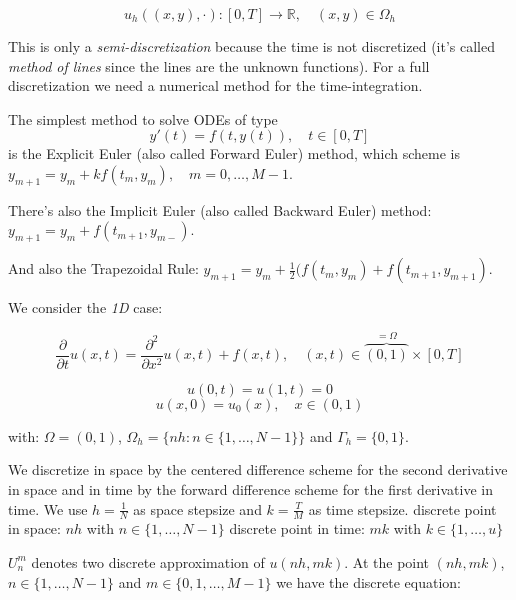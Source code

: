 \begin{equation*}
u_h ((x, y), \cdot): [0, T] \rightarrow \mathbb{R}, \quad (x, y) \in \Omega_h
\end{equation*}

This is only a \textit{semi-discretization} because the time is not discretized (it's called \textit{method of lines} since the lines are the unknown functions).
For a full discretization we need a numerical method for the time-integration.

The simplest method to solve ODEs of type
\begin{equation*}
y'(t) = f(t, y(t)), \quad t \in [0, T]
\end{equation*}
is the Explicit Euler (also called Forward Euler) method, which scheme is $y_{m+1} = y_m + k f(t_m, y_m), \quad m=0, \dots, M-1$.

There's also the Implicit Euler (also called Backward Euler) method: $y_{m+1} = y_m + f(t_{m+1}, y_{m-})$.

And also the Trapezoidal Rule: $y_{m+1} = y_m + \frac{1}{2} (f(t_m, y_m) + f(t_{m+1}, y_{m+1})$.

We consider the \textit{1D} case:

\begin{equation*}
\frac{\partial}{\partial t} u(x, t) = \frac{\partial^2}{\partial x^2} u(x, t) + f(x, t), \quad (x, t) \in \overbrace{(0, 1)}^{= \Omega} \times [0, T]
\end{equation*}

\begin{equation*}
u(0, t) = u(1, t) = 0
\end{equation*}
\begin{equation*}
u(x, 0) = u_0(x), \quad x \in (0, 1)
\end{equation*}

with: $\Omega = (0, 1)$, $\Omega_h = \{nh: n \in \{1, \dots, N-1\} \}$ and $\Gamma_h = \{0, 1\}$.

We discretize in space by the centered difference scheme for the second derivative in space and in time by the forward difference scheme for the first derivative in time. We use $h = \frac{1}{N}$ as space stepsize and $k = \frac{T}{M}$ as time stepsize.
discrete point in space: $nh$ with $n \in \{1, \dots, N-1\}$ 
discrete point in time: $mk$ with $k \in \{1, \dots, u\}$ 

$U_n^m$ denotes two discrete approximation of $u(nh, mk)$.
At the point $(nh, mk)$, $n \in \{1, \dots, N-1\}$ and $m \in \{0, 1, \dots, M-1\}$ we have the discrete equation:

